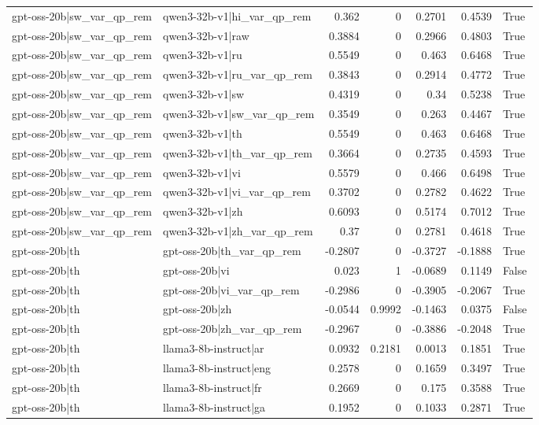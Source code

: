 \begin{table}
\begin{tabular}{l l r r r r l}
gpt-oss-20b|sw_var_qp_rem & qwen3-32b-v1|hi_var_qp_rem & 0.362 & 0 & 0.2701 & 0.4539 & True \\
gpt-oss-20b|sw_var_qp_rem & qwen3-32b-v1|raw & 0.3884 & 0 & 0.2966 & 0.4803 & True \\
gpt-oss-20b|sw_var_qp_rem & qwen3-32b-v1|ru & 0.5549 & 0 & 0.463 & 0.6468 & True \\
gpt-oss-20b|sw_var_qp_rem & qwen3-32b-v1|ru_var_qp_rem & 0.3843 & 0 & 0.2914 & 0.4772 & True \\
gpt-oss-20b|sw_var_qp_rem & qwen3-32b-v1|sw & 0.4319 & 0 & 0.34 & 0.5238 & True \\
gpt-oss-20b|sw_var_qp_rem & qwen3-32b-v1|sw_var_qp_rem & 0.3549 & 0 & 0.263 & 0.4467 & True \\
gpt-oss-20b|sw_var_qp_rem & qwen3-32b-v1|th & 0.5549 & 0 & 0.463 & 0.6468 & True \\
gpt-oss-20b|sw_var_qp_rem & qwen3-32b-v1|th_var_qp_rem & 0.3664 & 0 & 0.2735 & 0.4593 & True \\
gpt-oss-20b|sw_var_qp_rem & qwen3-32b-v1|vi & 0.5579 & 0 & 0.466 & 0.6498 & True \\
gpt-oss-20b|sw_var_qp_rem & qwen3-32b-v1|vi_var_qp_rem & 0.3702 & 0 & 0.2782 & 0.4622 & True \\
gpt-oss-20b|sw_var_qp_rem & qwen3-32b-v1|zh & 0.6093 & 0 & 0.5174 & 0.7012 & True \\
gpt-oss-20b|sw_var_qp_rem & qwen3-32b-v1|zh_var_qp_rem & 0.37 & 0 & 0.2781 & 0.4618 & True \\
gpt-oss-20b|th & gpt-oss-20b|th_var_qp_rem & -0.2807 & 0 & -0.3727 & -0.1888 & True \\
gpt-oss-20b|th & gpt-oss-20b|vi & 0.023 & 1 & -0.0689 & 0.1149 & False \\
gpt-oss-20b|th & gpt-oss-20b|vi_var_qp_rem & -0.2986 & 0 & -0.3905 & -0.2067 & True \\
gpt-oss-20b|th & gpt-oss-20b|zh & -0.0544 & 0.9992 & -0.1463 & 0.0375 & False \\
gpt-oss-20b|th & gpt-oss-20b|zh_var_qp_rem & -0.2967 & 0 & -0.3886 & -0.2048 & True \\
gpt-oss-20b|th & llama3-8b-instruct|ar & 0.0932 & 0.2181 & 0.0013 & 0.1851 & True \\
gpt-oss-20b|th & llama3-8b-instruct|eng & 0.2578 & 0 & 0.1659 & 0.3497 & True \\
gpt-oss-20b|th & llama3-8b-instruct|fr & 0.2669 & 0 & 0.175 & 0.3588 & True \\
gpt-oss-20b|th & llama3-8b-instruct|ga & 0.1952 & 0 & 0.1033 & 0.2871 & True \\

\end{tabular}
\end{table}
